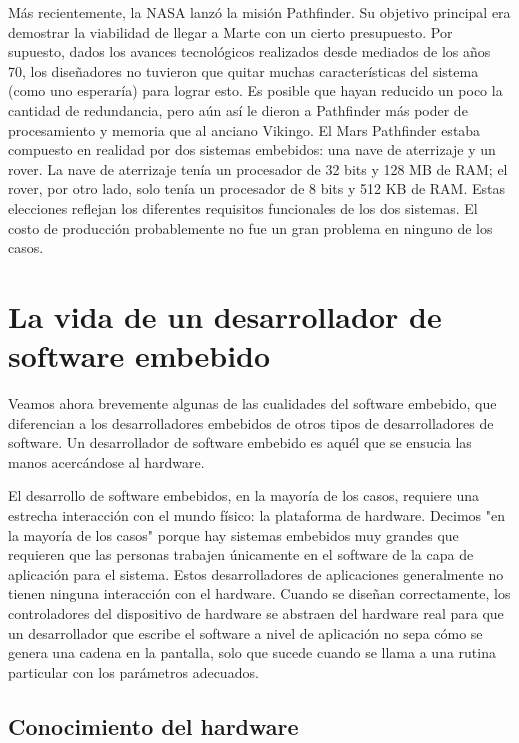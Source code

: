 \documentclass[output=paper, 
colorlinks,
citecolor=brown,
newtxmath
]{langscibook}
\begin{document}
Más recientemente, la NASA lanzó la misión Pathfinder. Su objetivo principal era 
demostrar la viabilidad de llegar a Marte con un cierto presupuesto. 
Por supuesto, dados los avances tecnológicos realizados desde mediados de 
los años 70, los diseñadores no tuvieron que quitar muchas características del sistema (como uno esperaría)
para lograr esto. Es posible que hayan reducido un poco la cantidad de 
redundancia, pero aún así le dieron a Pathfinder más poder de procesamiento y memoria
que al anciano Vikingo. El Mars Pathfinder estaba compuesto en realidad 
por dos sistemas embebidos: una nave de aterrizaje y un rover. 
La nave de aterrizaje tenía un procesador de 32 bits y 128 MB de RAM; 
el rover, por otro lado, solo tenía un procesador de 8 bits y 512 KB de RAM. 
Estas elecciones reflejan los diferentes requisitos funcionales de los dos 
sistemas. El costo de producción probablemente no fue un gran problema en 
ninguno de los casos.



\section {La vida de un desarrollador de software embebido}

Veamos ahora brevemente algunas de las cualidades del software embebido, 
que diferencian a los desarrolladores embebidos de otros tipos de desarrolladores de software. 
Un desarrollador de software embebido es aquél que se ensucia las manos acercándose al hardware.

El desarrollo de software embebidos, en la mayoría de los casos, requiere una estrecha interacción 
con el mundo físico: la plataforma de hardware. Decimos "en la mayoría de los casos" 
porque hay sistemas embebidos muy grandes que requieren que las personas trabajen 
únicamente en el software de la capa de aplicación para el sistema. 
Estos desarrolladores de aplicaciones generalmente no tienen ninguna 
interacción con el hardware. Cuando se diseñan correctamente, los controladores 
del dispositivo de hardware se abstraen del hardware real para que un 
desarrollador que escribe el software a nivel de aplicación no sepa cómo se 
genera una cadena en la pantalla, solo que sucede cuando se llama a una 
rutina particular con los parámetros adecuados.


\subsection {Conocimiento del hardware}
\end{document}
